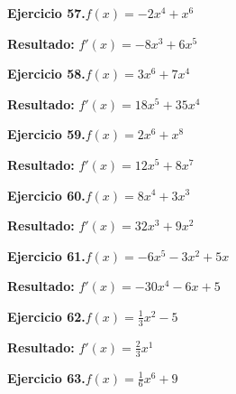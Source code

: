 \documentclass[10pt,a4paper]{article}
\begin{document}
\begin{ejbox}
\textbf{Ejercicio 57.}\quad $f(x) = -2x^{4} + x^{6}$
\end{ejbox}

\begin{solbox}
\textbf{Resultado:} \(\displaystyle f'(x) = -8x^{3} + 6x^{5}\)
\end{solbox}

\newpage
\begin{ejbox}
\textbf{Ejercicio 58.}\quad $f(x) = 3x^{6} + 7x^{4}$
\end{ejbox}

\begin{solbox}
\textbf{Resultado:} \(\displaystyle f'(x) = 18x^{5} + 35x^{4}\)
\end{solbox}

\begin{ejbox}
\textbf{Ejercicio 59.}\quad $f(x) = 2x^{6} + x^{8}$
\end{ejbox}

\begin{solbox}
\textbf{Resultado:} \(\displaystyle f'(x) = 12x^{5} + 8x^{7}\)
\end{solbox}

\begin{ejbox}
\textbf{Ejercicio 60.}\quad $f(x) = 8x^{4} +3x^{3}$
\end{ejbox}

\begin{solbox}
\textbf{Resultado:} \(\displaystyle f'(x) = 32x^{3} +9x^{2}\)
\end{solbox}

\newpage
\begin{ejbox}
\textbf{Ejercicio 61.}\quad $f(x) = -6x^{5} -3x^2 +5x$
\end{ejbox}

\begin{solbox}
\textbf{Resultado:} \(\displaystyle f'(x) = -30x^{4} -6x +5\)
\end{solbox}

\begin{ejbox}
\textbf{Ejercicio 62.}\quad $f(x) = \frac{1}{3}x^{2} -5$
\end{ejbox}

\begin{solbox}
\textbf{Resultado:} \(\displaystyle f'(x) = \frac{2}{3}x^{1}\)
\end{solbox}

\begin{ejbox}
\textbf{Ejercicio 63.}\quad $f(x) = \frac{1}{6}x^{6} +9$
\end{ejbox}
\end{document}
